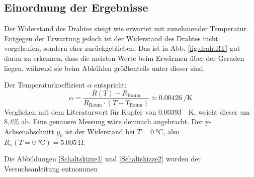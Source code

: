 \documentclass[11pt,a4paper,titlepage, ngerman]{article}
\begin{document}
		\subsection{Einordnung der Ergebnisse}	
			
			Der Widerstand des Drahtes steigt wie erwartet mit zunehmender Temperatur. 
			Entgegen der Erwartung jedoch ist der Widerstand des Drahtes nicht vorgelaufen, sondern eher zurückgeblieben.
			Das ist in Abb. \ref{fig:drahtRT} gut daran zu erkennen, dass die meisten Werte beim Erwärmen über der Geraden liegen, während sie beim Abkühlen größtenteils unter dieser sind.
			
			Der Temperaturkoeffizient $\alpha$ entspricht:
			\begin{equation*}
				\alpha = \frac{R(T)-R_\text{Raum}}{R_\text{Raum}\cdot (T-T_\text{Raum})} \approx \SI{0,00426}{\per\kelvin}
			\end{equation*} 
			Verglichen mit dem Literaturwert für Kupfer von \SI{0,00393}{\per\kelvin}, weicht dieser um 8,4\% ab. Eine genauere Messung wäre demnach angebracht.
			Der y-Achsenabschnitt $y_0$ ist der Widerstand bei $T=\SI{0}{\celsius}$, also $R_x(T=\SI{0}{\celsius}) = \SI{5,005}{\ohm}$.
		
	\begin{thebibliography}	{}
		Die Abbildungen \ref{Schaltskizze1} und \ref{Schaltskizze2} wurden der Versuchsanleitung entnommen
	\end{thebibliography}	
			
\end{document}
